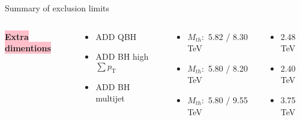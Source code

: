 \documentclass[8pt]{beamer}
\newcommand{\mySmallCenterBox}[2][pink] {
   {\centering
    \noindent\colorbox{#1}{
	\textbf{{\small #2}}
    }\par
  }
}
\begin{document}
\begin{frame}{\large Summary of exclusion limits}
 \vspace{0.2cm}
 
 \begin{columns}
  \begin{column}{3cm}
    \mySmallCenterBox{Extra dimentions}
  \end{column}
  \begin{column}{3cm}
    \begin{itemize}
     \item[\EightStarBold] ADD QBH
     \item[\EightStarBold] ADD BH high $\sum p_\mathrm{T}$
     \item[\EightStarBold] ADD BH multijet
    \end{itemize}
  \end{column}
  \begin{column}{3.3cm}
    \begin{itemize}
     \item[] $M_{th}:$ 5.82 / 8.30 TeV
     \item[] $M_{th}:$ 5.80 / 8.20 TeV
     \item[] $M_{th}:$ 5.80 / 9.55 TeV
    \end{itemize}
  \end{column}
  \begin{column}{2.7cm}
    \begin{itemize}
     \item[] 2.48 TeV
     \item[] 2.40 TeV
     \item[] 3.75 TeV
    \end{itemize}
  \end{column}
 \end{columns}

 \vspace{0.2cm}
 

\end{frame}
\end{document}
